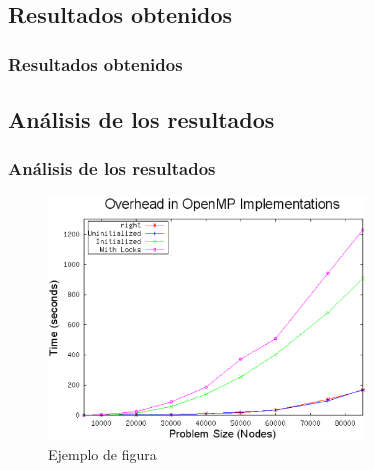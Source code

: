 \documentclass{beamer}
\begin{document}
\subsection{Resultados obtenidos}
\begin{frame}
\frametitle{Resultados obtenidos}



\end{frame}


\subsection{Análisis de los resultados}
\begin{frame}
\frametitle{Análisis de los resultados}

\begin{figure}[!th]
\begin{center}
\includegraphics[width=0.75\textwidth]{img/figura1.eps}
\caption{Ejemplo de figura}
\label{fig:1}
\end{center}
\end{figure}

\end{frame}
\end{document}
